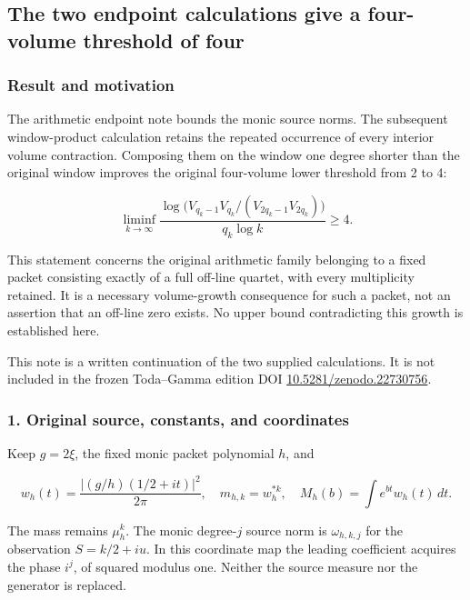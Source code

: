 \subsection{The two endpoint calculations give a four-volume threshold of four}\label{endpoint-four_volume_threshold--the-two-endpoint-calculations-give-a-four-volume-threshold-of-four}

\subsubsection{Result and motivation}\label{endpoint-four_volume_threshold--result-and-motivation}

The arithmetic endpoint note bounds the monic source norms. The subsequent window-product calculation retains the repeated occurrence of every interior volume contraction. Composing them on the window one degree shorter than the original window improves the original four-volume lower threshold from 2 to 4:

\[
\boxed{\liminf_{k\to\infty}
\frac{\log\bigl(V_{q_k-1}V_{q_k}/(V_{2q_k-1}V_{2q_k})\bigr)}
{q_k\log k}\ge4.}
\]

This statement concerns the original arithmetic family belonging to a fixed packet consisting exactly of a full off-line quartet, with every multiplicity retained. It is a necessary volume-growth consequence for such a packet, not an assertion that an off-line zero exists. No upper bound contradicting this growth is established here.

This note is a written continuation of the two supplied calculations. It is not included in the frozen Toda--Gamma edition DOI \href{https://doi.org/10.5281/zenodo.22730756}{10.5281/zenodo.22730756}.

\subsubsection{1. Original source, constants, and coordinates}\label{endpoint-four_volume_threshold--original-source-constants-and-coordinates}

Keep \(g=2\xi\), the fixed monic packet polynomial \(h\), and

\[
w_h(t)=\frac{|(g/h)(1/2+it)|^2}{2\pi},\quad
m_{h,k}=w_h^{*k},\quad M_h(b)=\int e^{bt}w_h(t)\,dt.
\]

The mass remains \(\mu_h^k\). The monic degree-\(j\) source norm is \(\omega_{h,k,j}\) for the observation \(S=k/2+iu\). In this coordinate map the leading coefficient acquires the phase \(i^j\), of squared modulus one. Neither the source measure nor the generator is replaced.

